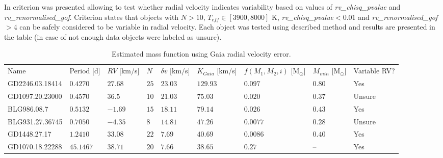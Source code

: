 \documentclass{pracalicmgr}
\begin{document}
In \citep{katz_gaia_2022} criterion was presented allowing to test whether radial velocity indicates variability based on values of {\it{rv\_chisq\_pvalue}}
and {\it{rv\_renormalised\_gof}}. Criterion states that objects with $N>10$, $T_{eff}\in [3900,8000]$ K, {\it{rv\_chisq\_pvalue}}$<0.01$ 
and {\it{rv\_renormalised\_gof}}$>4$ can be safely considered to be variable in radial velocity. Each object was tested using described method 
and results are presented in the table (in case of not enough data objects were labeled as unsure).
\begin{table}[H]
    \footnotesize
    \centering
    \setlength{\tabcolsep}{3pt}
    \begin{center}
    \begin{tabular}{lllllllll}
    Name & Period [d]& $RV$ [km/s]& $N$  &  $\delta v$  [km/s]   & $K_{Gaia}$ [km/s]  & $f(M_1,M_2,i)$ [M$_{\odot}$]& $M_{min}$ [M$_{\odot}$]&Variable RV?\\
    GD2246.03.18414 & $0.4270$ & $27.68$ & $25$ & $23.03$ & $129.93$ & $0.097$  & $0.80$ & Yes\\
    GD1097.20.23000 & $0.4570$ & $36.5$  & $10$ & $21.03$ & $75.03$  & $0.020$  & $0.37$& Unsure\\
    BLG986.08.7     & $0.5132$  & $-1.69$ & $15$ & $18.11$ & $79.14$   & $0.026$  & $0.43$& Yes\\
    BLG931.27.36745 & $0.7050$   & $-4.35$ & $8$  & $14.81$ & $47.26$  & $0.0077$ & $0.28$& Unsure\\
    GD1448.27.17    & $1.2410$  & $33.08$ & $22$ & $7.69$  & $40.69$  & $0.0086$ & $0.40$& Yes\\
    GD1070.18.22288 & $45.1467$  & $38.71$ & $20$ & $7.66$  & $38.65$  & $0.27$  & -- & Yes\\
    \end{tabular}
    \end{center}
    
    \caption{Estimated mass function using Gaia radial velocity error.}\label{mass_function_table}
\end{table}
\end{document}
